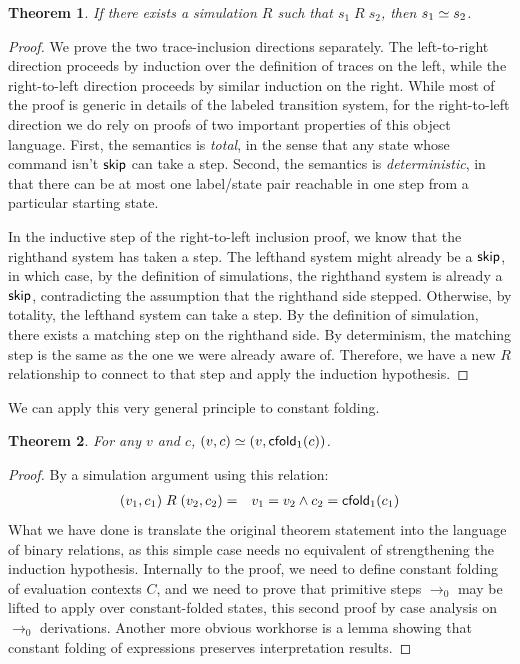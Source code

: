 \documentclass{amsbook}
\newtheorem{theorem}{Theorem}[chapter]
\theoremstyle{definition}
\theoremstyle{remark}
\numberwithin{section}{chapter}
\numberwithin{equation}{chapter}
\begin{document}
\begin{theorem}
  \label{simulation_ok}If there exists a simulation $R$ such that $s_1 \; R \; s_2$, then $s_1 \simeq s_2$.
\end{theorem}
\begin{proof}
  We prove the two trace-inclusion directions separately.
  The left-to-right direction proceeds by induction over the definition of traces on the left, while the right-to-left direction proceeds by similar induction on the right.
  While most of the proof is generic in details of the labeled transition system, for the right-to-left direction we do rely on proofs of two important properties of this object language.
  First, the semantics is \emph{total}, in the sense that any state whose command isn't $\mathsf{skip}$ can take a step.
  Second, the semantics is \emph{deterministic}, in that there can be at most one label/state pair reachable in one step from a particular starting state.

  In the inductive step of the right-to-left inclusion proof, we know that the righthand system has taken a step.
  The lefthand system might already be a $\mathsf{skip}$, in which case, by the definition of simulations, the righthand system is already a $\mathsf{skip}$, contradicting the assumption that the righthand side stepped.
  Otherwise, by totality, the lefthand system can take a step.
  By the definition of simulation, there exists a matching step on the righthand side.
  By determinism, the matching step is the same as the one we were already aware of.
  Therefore, we have a new $R$ relationship to connect to that step and apply the induction hypothesis.
\end{proof}

We can apply this very general principle to constant folding.

\begin{theorem}
  \label{cfold_ok}For any $v$ and $c$, $(v, c) \simeq (v, \mathsf{cfold}_1(c))$.
\end{theorem}
\begin{proof}
  By a simulation argument using this relation:
  \begin{eqnarray*}
    (v_1, c_1) \; R \; (v_2, c_2) &=& v_1 = v_2 \land c_2 = \mathsf{cfold}_1(c_1)
  \end{eqnarray*}
  What we have done is translate the original theorem statement into the language of binary relations, as this simple case needs no equivalent of strengthening the induction hypothesis.
  Internally to the proof, we need to define constant folding of evaluation contexts $C$, and we need to prove that primitive steps $\to_0$ may be lifted to apply over constant-folded states, this second proof by case analysis on $\to_0$ derivations.
  Another more obvious workhorse is a lemma showing that constant folding of expressions preserves interpretation results.
\end{proof}
\end{document}
